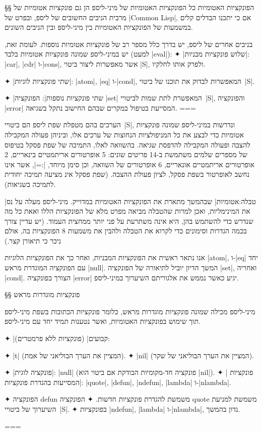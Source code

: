 §§ הפונקציות האטומיות
כל הפונקציות האטומיות של מיני-ליספ הן גם פונקציות אטומיות של מרבית הניבים
החשובים של ליספ, ובפרט של \E|Common Lisp|, אם כי יתכנו הבדלים קלים במשמעות של
הפונקציות האטומיות בין מיני-ליספ ובין הניבים השונים.

בניבים אחרים של ליספ, יש בדרך כלל מספר רב של פונקציות אטומיות נוספות. לעומת
זאת, יש במיני-ליספ שמונה פונקציות אטומיות בלבד (למעט \E|eval|):
✦ \ע|שלוש פונקציות מבניות|: \E|car|, \E|cdr| ו-\E|cons|, אשר מאפשרות ליצור ביטוי
\E|S|, ולפרק אותו לחלקיו.

✦ \ע|שתי פונקציות לוגיות|: \E|atom|, \E|eq| ו-\E|cond|, המאפשרות לבדוק את תוכנו של
ביטוי~\E|S|.

✦ \ע|שתי פונקציות נוספות|: הפונקציה \E|set| המאפשרת לתת שמות לביטויי~\E|S|,
והפונקציה \E|error| המסייעת בטיפול במקרים שבהם החישוב נתקל בשגיאה.
===

הערכים בהם מטפלת שפת ליספ הם ביטויי~\E|S|, ונדרשות במיני-ליספ שמונה פונקציות
אטומיות כדי לבצע את כל המניפולציות הנחוצות של ערכים אלו, וביניהן פעולה המקבילה
להצבה ופעולה המקבילה להדפסת שגיאה. בהשוואה לאלו, התמיכה של שפת פסקל בטיפוס של
מספרים שלמים משתמשת ב-14 פריטים שונים: 5 אופרטורים אריתמטיים בינאריים, 2
אופרטורים אריתמטיים אונאריים, 6 אופרטורים של השוואה, וכן סימן מיוחד, \E|:=|,
אשר אינו נחשב לאופרטור בשפת פסקל, לציון פעולת ההצבה. (שפת פסקל אינ מציעה תמיכה
יחודית לתמיכה בשגיאות).

|טבלה:אטומיות| שבהמשך מתארת את הפונקציות האטומיות במדוייק. מיני-ליספ מעלה
על נס את המינימליות, ואכן למרות שהטבלה מביאה מפרט מלא של הפונקציות הללו ואאת כל
מה שנדרש כדי להשתמש בהן, היא אינה משתרעת על פני יותר ממחצית העמוד. (יש עדיין
צורך בכמה הגדרות וסימונים כדי לקרוא את הטבלה ולהבין את משמעות 8 הפונקציות בה,
אולם ניכר כי תיאורן קצר.)

אנו נתאר ראשית את הפונקציות המבניות, ואחר כך את הפונקציות הלוגיות \E|atom|,
ו-\E|eq| יחד עם הפונקציה המוגדרת מראש \E|null|. המשך הדיון יוביל לתיאורה של
הפונקציה \E|set|, ואחריה \E|cond|. הצורך בפונקציה \E|error| יגיע כאשר נממש את
אלגוריתם השיערוך במיני-ליספ.

§§ פונקציות מוגדרות מראש

מיני-ליספ מכילה שמונה פונקציות מוגדרות מראש, כלומר פונקציות הכתובות
בשפת מיני-ליספ תוך שימוש בפונקציות האטומיות, ואשר נטענות תמיד יחד עם
מיני-ליספ.

✦ \ע|קבועים| (פונקציות ללא פרמטרים):
\begin{itemize}
  ✦ \E|t| (המציין את הערך הבוליאני של אמת).
  ✦ \E|nil| (המציין את הערך הבוליאני של שקר).
\end{itemize}
✦ \ע|פונקציה לוגית|: \E|null| (פונקציה חד-מקומיות הבודקת אם ביטוי הוא \E|nil|).
✦ \ע| פונקציות המסייעות בהגדרת פונקציות|:
\E|quote|, \E|defun|, \E|ndefun|, \E|lambda| ו-\E|nlambda|.
\begin{itemize}
  ✦ הפונקציה defun משמשת להגדרת פונקציות חדשות.
  ✦ הפונקציה quote משמשת למניעת השיערוך של ביטויי~\E|S|.
  ✦ בפונקציות \E|ndefun|, \E|lambda| ו-\E|nlambda|, נדון בהמשך.
\end{itemize}
===

